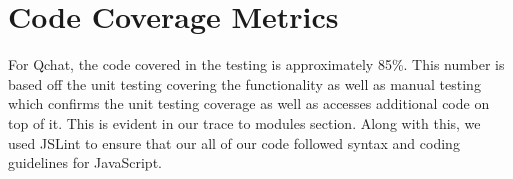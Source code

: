 \documentclass[12pt, titlepage]{article}
\begin{document}
\section{Code Coverage Metrics}

For Qchat, the code covered in the testing is approximately 85\%. This number is based off the unit testing covering the functionality as well as manual testing which confirms the unit testing coverage as well as accesses additional code on top of it. This is evident in our trace to modules section. Along with this, we used JSLint to ensure that our all of our code followed syntax and coding guidelines for JavaScript.





\end{document}
